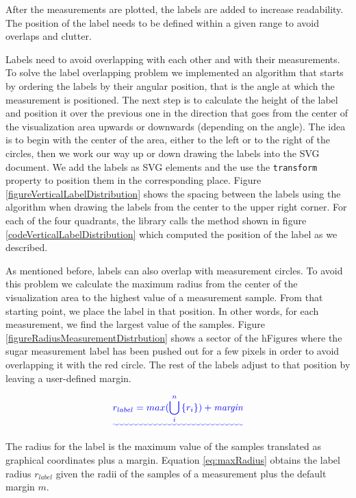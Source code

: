 \documentclass[twocolumn]{bmcart}%
\providecommand{\DIFadd}[1]{{\protect\color{blue}\uwave{#1}}} %
\providecommand{\DIFaddbegin}{} %
\providecommand{\DIFaddend}{} %
\begin{document}
After the measurements are plotted, the labels are added to increase readability. The position of the label needs to be defined within a given range to avoid overlaps and clutter.


Labels need to avoid overlapping with each other and with their measurements. To solve the label overlapping problem we implemented an algorithm that starts by ordering the labels by their angular position, that is the angle at which the measurement is positioned. The next step is to calculate the height of the label and position it over the previous one in the direction that goes from the center of the visualization area upwards or downwards (depending on the angle). The idea is to begin with the center of the area, either to the left or to the right of the circles, then we work our way up or down drawing the labels into the SVG document. We add the labels as SVG elements and the use the \texttt{transform} property to position them in the corresponding place. Figure \ref{figureVerticalLabelDistribution} shows the spacing between the labels using the algorithm when drawing the labels from the center to the upper right corner. For each of the four quadrants, the library calls the method shown in figure \ref{codeVerticalLabelDistribution} which computed the position of the label as we described.

As mentioned before, labels can also overlap with measurement circles. To avoid this problem we calculate the maximum radius from the center of the visualization area to the highest value of a measurement sample. From that starting point, we place the label in that position. In other words, for each measurement, we find the largest value of the samples. Figure \ref{figureRadiusMeasurementDistrbution} shows a sector of the hFigures where the sugar measurement label has been pushed out for a few pixels in order to avoid overlapping it with the red circle. The rest of the labels adjust to that position by leaving a user-defined margin.

\DIFaddbegin \begin{equation}\DIFadd{ \label{eq:maxRadius}
	r_{label} = max(\bigcup_{i}^{n} \left \{ r_{i} \right \} ) + \textit{margin}
}\end{equation}

\DIFaddend The radius for the label is the maximum value of the samples translated as graphical coordinates plus a margin. Equation \ref{eq:maxRadius} obtains the label radius $r_{label}$ given the radii of the samples of a measurement plus the default margin $m$.
\end{document}

